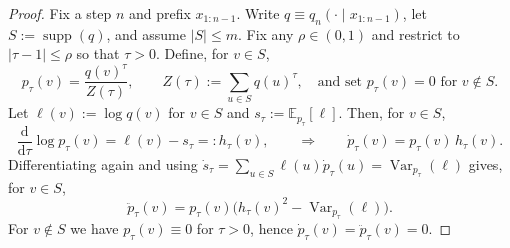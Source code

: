 \begin{proof}
Fix a step $n$ and prefix $x_{1:n-1}$. Write $q\equiv q_n(\cdot\mid x_{1:n-1})$, let $S:=\operatorname{supp}(q)$, and assume $|S|\le m$. Fix any $\rho\in(0,1)$ and restrict to $|\tau-1|\le\rho$ so that $\tau>0$. Define, for $v\in S$,
\[
 p_{\tau}(v)=\frac{q(v)^{\tau}}{Z(\tau)},\qquad Z(\tau):=\sum_{u\in S} q(u)^{\tau},\quad\text{and set }p_{\tau}(v)=0\text{ for }v\notin S.
\]
Let $\ell(v):=\log q(v)$ for $v\in S$ and $s_{\tau}:=\mathbb{E}_{p_{\tau}}[\ell]$. Then, for $v\in S$,
\[
 \frac{\mathrm d}{\mathrm d\tau}\log p_{\tau}(v)=\ell(v)-s_{\tau}=:h_{\tau}(v),\qquad \Rightarrow\qquad \dot{p}_{\tau}(v)=p_{\tau}(v)\,h_{\tau}(v).
\]
Differentiating again and using $\dot{s}_{\tau}=\sum_{u\in S}\ell(u)\dot{p}_{\tau}(u)=\operatorname{Var}_{p_{\tau}}(\ell)$ gives, for $v\in S$,
\begin{equation}\tag{1}
 \ddot{p}_{\tau}(v)=p_{\tau}(v)\big(h_{\tau}(v)^2-\operatorname{Var}_{p_{\tau}}(\ell)\big).
\end{equation}
For $v\notin S$ we have $p_{\tau}(v)\equiv 0$ for $\tau>0$, hence $\dot{p}_{\tau}(v)=\ddot{p}_{\tau}(v)=0$.


\end{proof}
